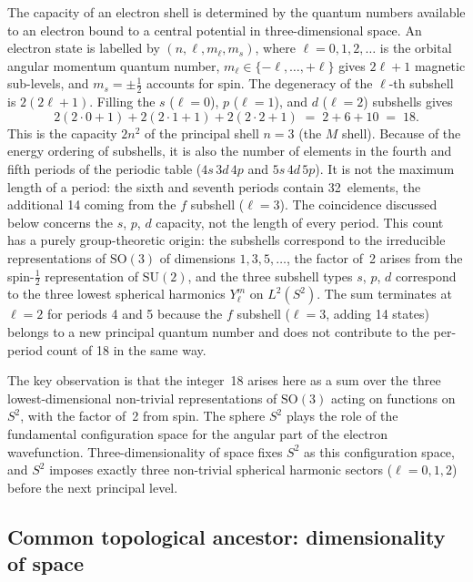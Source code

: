\documentclass[11pt,a4paper]{article}
\theoremstyle{definition}
\begin{document}
The capacity of an electron shell is determined by the quantum numbers available to an electron bound to a central potential in three-dimensional space. An electron state is labelled by $(n, \ell, m_\ell, m_s)$, where $\ell = 0, 1, 2, \ldots$ is the orbital angular momentum quantum number, $m_\ell \in \{-\ell, \ldots, +\ell\}$ gives $2\ell+1$ magnetic sub-levels, and $m_s = \pm\tfrac{1}{2}$ accounts for spin. The degeneracy of the $\ell$-th subshell is $2(2\ell+1)$. Filling the $s$ ($\ell=0$), $p$ ($\ell=1$), and $d$ ($\ell=2$) subshells gives
\[
  2(2 \cdot 0 + 1) + 2(2 \cdot 1 + 1) + 2(2 \cdot 2 + 1) \;=\; 2 + 6 + 10 \;=\; 18.
\]
This is the capacity $2n^2$ of the principal shell $n = 3$ (the $M$ shell). Because of the energy ordering of subshells, it is also the number of elements in the fourth and fifth periods of the periodic table ($4s\,3d\,4p$ and $5s\,4d\,5p$). It is not the maximum length of a period: the sixth and seventh periods contain 32~elements, the additional 14 coming from the $f$ subshell ($\ell = 3$). The coincidence discussed below concerns the $s$, $p$, $d$ capacity, not the length of every period.
This count has a purely group-theoretic origin: the subshells correspond to the irreducible representations of $\mathrm{SO}(3)$ of dimensions $1, 3, 5, \ldots$, the factor of~2 arises from the spin-$\tfrac{1}{2}$ representation of $\mathrm{SU}(2)$, and the three subshell types $s$, $p$, $d$ correspond to the three lowest spherical harmonics $Y_\ell^m$ on $L^2(S^2)$.\cite{Fulton_Harris_1991,Sakurai_Napolitano_2017} The sum terminates at $\ell = 2$ for periods 4 and 5 because the $f$ subshell ($\ell = 3$, adding 14 states) belongs to a new principal quantum number and does not contribute to the per-period count of 18 in the same way.

The key observation is that the integer~18 arises here as a sum over the three lowest-dimensional non-trivial representations of $\mathrm{SO}(3)$ acting on functions on $S^2$, with the factor of~2 from spin. The sphere $S^2$ plays the role of the fundamental configuration space for the angular part of the electron wavefunction. Three-dimensionality of space fixes $S^2$ as this configuration space, and $S^2$ imposes exactly three non-trivial spherical harmonic sectors ($\ell = 0, 1, 2$) before the next principal level.

\subsection{Common topological ancestor: dimensionality of space}
\label{subsec:ancestor}
\end{document}
